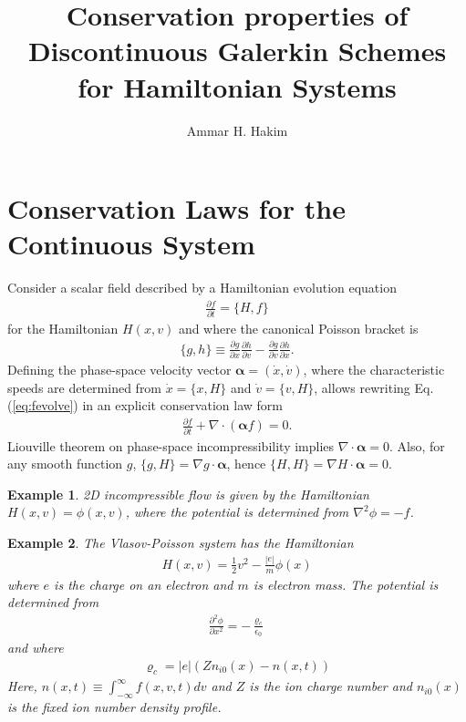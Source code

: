\documentclass[11pt, reqno]{amsart}
\title[Conservation for Hamiltonian System]{Conservation properties of
  Discontinuous Galerkin Schemes for Hamiltonian Systems}
\author{Ammar H. Hakim}%
\date{}%
\newcommand{\eqr}[1]{Eq.\thinspace(#1)}
\newcommand{\pfrac}[2]{\frac{\partial #1}{\partial #2}}
\newcommand{\gvec}[1]{\boldsymbol{#1}}
\newtheorem{example}{Example}
\theoremstyle{definition}
\begin{document}
%
\maketitle

\section{Conservation Laws for the Continuous System}

Consider a scalar field described by a Hamiltonian evolution equation
\begin{align}
  \pfrac{f}{t} = \{H,f\} \label{eq:fevolve}
\end{align}
for the Hamiltonian $H(x,v)$ and where the canonical Poisson bracket is
\begin{align}
  \{g,h\} \equiv \pfrac{g}{x}\pfrac{h}{v} - \pfrac{g}{v}\pfrac{h}{x}.
\end{align}
Defining the phase-space velocity vector $\gvec{\alpha} = (\dot{x},
\dot{v})$, where the characteristic speeds are determined from
$\dot{x} = \{x,H\}$ and $\dot{v} = \{v,H\}$, allows rewriting
\eqr{\ref{eq:fevolve}} in an explicit conservation law form
\begin{align}
  \pfrac{f}{t} + \nabla\cdot\left(\gvec{\alpha}f\right) = 0.
\end{align}
Liouville theorem on phase-space incompressibility implies
$\nabla\cdot\gvec{\alpha} = 0$. Also, for any smooth function $g$,
$\{g,H\} = \nabla g\cdot\gvec{\alpha}$, hence $\{H,H\}=\nabla H \cdot
\gvec{\alpha} = 0$.

\begin{example}
  2D incompressible flow is given by the Hamiltonian $H(x,v)=\phi(x,v)$,
  where the potential is determined from $\nabla^2 \phi = -f$.
\end{example}

\begin{example}
  The Vlasov-Poisson system has the Hamiltonian
  \begin{align}
    H(x,v) = \frac{1}{2}v^2 - \frac{|e|}{m}\phi(x)
  \end{align}
  where $e$ is the charge on an electron and $m$ is electron mass. The
  potential is determined from
  \begin{align}
    \frac{\partial^2 \phi}{\partial x^2} = -\frac{\varrho_c}{\epsilon_0}
  \end{align}
  and where
  \begin{align}
    \varrho_c = |e| \left(Zn_{i0}(x) - n(x,t)\right) \label{eq:vp-poisson}
  \end{align}
  Here, $n(x,t) \equiv \int_{-\infty}^{\infty} f(x,v,t) dv$ and $Z$ is
  the ion charge number and $n_{i0}(x)$ is the fixed ion number density
  profile.
\end{example}
\end{document}
